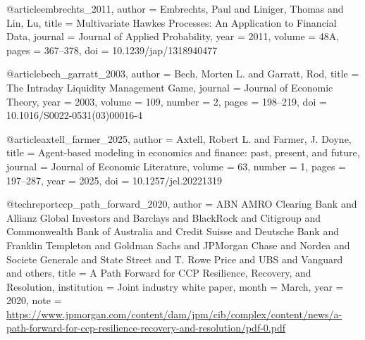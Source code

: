 @article{embrechts_2011,
  author  = {Embrechts, Paul and Liniger, Thomas and Lin, Lu},
  title   = {Multivariate Hawkes Processes: An Application to Financial Data},
  journal = {Journal of Applied Probability},
  year    = {2011}, volume = {48A}, pages = {367--378},
  doi     = {10.1239/jap/1318940477}
}


@article{bech_garratt_2003,
  author  = {Bech, Morten L. and Garratt, Rod},
  title   = {The Intraday Liquidity Management Game},
  journal = {Journal of Economic Theory},
  year    = {2003}, volume = {109}, number = {2}, pages = {198--219},
  doi     = {10.1016/S0022-0531(03)00016-4}
}




@article{axtell_farmer_2025,
  author  = {Axtell, Robert L. and Farmer, J. Doyne},
  title   = {Agent-based modeling in economics and finance: past, present, and future},
  journal = {Journal of Economic Literature},
  volume  = {63},
  number  = {1},
  pages   = {197--287},
  year    = {2025},
  doi     = {10.1257/jel.20221319}
}


@techreport{ccp_path_forward_2020,
  author      = {{ABN AMRO Clearing Bank} and {Allianz Global Investors} and
                 {Barclays} and {BlackRock} and {Citigroup} and
                 {Commonwealth Bank of Australia} and {Credit Suisse} and
                 {Deutsche Bank} and {Franklin Templeton} and {Goldman Sachs} and
                 {JPMorgan Chase} and {Nordea} and {Societe Generale} and
                 {State Street} and {T. Rowe Price} and {UBS} and {Vanguard} and
                 others},
  title       = {A Path Forward for {CCP} Resilience, Recovery, and Resolution},
  institution = {Joint industry white paper},
  month       = {March},
  year        = {2020},
  note        = {\url{https://www.jpmorgan.com/content/dam/jpm/cib/complex/content/news/a-path-forward-for-ccp-resilience-recovery-and-resolution/pdf-0.pdf}}
}


